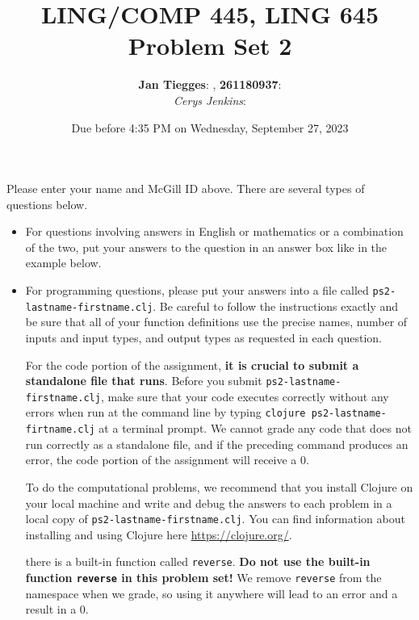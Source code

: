 \documentclass[10pt]{article}
\author{
  \textbf{Jan Tiegges}:       %
, \textbf{261180937}:  %
\\ \textit{Cerys Jenkins}:  %
}
\newcommand{\PSnum}{2}
\begin{document}
\title{LING/COMP 445, LING 645\\Problem Set \PSnum}
\date{Due before 4:35 PM on Wednesday, September 27, 2023}
\maketitle

Please enter your name and McGill ID above.  There are several types of questions
below.

\begin{itemize}
  \item For questions involving answers in English or mathematics or a
    combination of the two, put your answers to the question in an answer box
    like in the example below.
  \item For programming questions, please put your answers into a file called
    \texttt{ps\PSnum-lastname-firstname.clj}. Be careful to follow the
    instructions exactly and be sure that all of your function definitions use
    the precise names, number of inputs and input types, and output types as
    requested in each question.

    For the code portion of the assignment, \textbf{it is crucial to submit a
    standalone file that runs}. Before you submit
    \texttt{ps\PSnum-lastname-firstname.clj},  make sure that your code executes
    correctly without any errors  when run at the command line by typing
    \texttt{clojure ps\PSnum-lastname-firtname.clj} at a terminal prompt. We
    cannot grade any code that does not run correctly as a standalone file, and
    if the preceding command produces an error, the code portion of the
    assignment will receive a $0$.

    To do the computational problems, we recommend that you install Clojure on
    your local machine and write and debug the answers to each problem in a
    local copy of \texttt{ps\PSnum-lastname-firstname.clj}. You can find
    information about installing and using Clojure here
    \url{https://clojure.org/}.

    {\color{red}{Note} there is a built-in function called \texttt{reverse}.
      \textbf{Do not use the built-in function \texttt{reverse} in this problem
      set!} We remove \texttt{reverse} from the namespace when we grade, so
    using it anywhere will lead to an error and a result in a $0$.}
\end{itemize}
\end{document}
